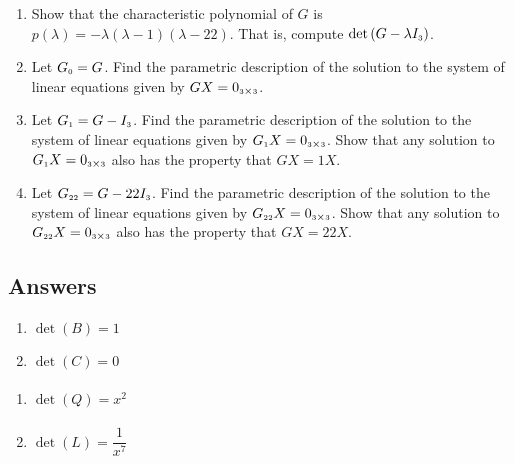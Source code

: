 \documentclass{ximera}
\begin{document}
\begin{enumerate}
\setcounter{enumi}{\value{HW}}

\item Show that the characteristic polynomial of $G$ is $p(\lambda) = -\lambda(\lambda - 1)(\lambda - 22)$.  That is, compute $\text{det}\left(G - \lambda I_{\mbox{\tiny$3$}}\right)$. \label{eigenfirst} 

\item Let $G_{\mbox{\tiny$0$}} = G$.  Find the parametric description of the solution to the system of linear equations given by $GX = 0_{\mbox{\tiny$3$} \times \mbox{\tiny$3$}}$.

\item Let $G_{\mbox{\tiny$1$}} = G - I_{\mbox{\tiny$3$}}$.  Find the parametric description of the solution to the system of linear equations given by $G_{\mbox{\tiny$1$}}X = 0_{\mbox{\tiny$3$} \times \mbox{\tiny$3$}}$.  Show that any solution to $G_{\mbox{\tiny$1$}}X = 0_{\mbox{\tiny$3$} \times \mbox{\tiny$3$}}$ also has the property that $GX = 1X$.

\item Let $G_{\mbox{\tiny$22$}} = G - 22 I_{\mbox{\tiny$3$}}$.  Find the parametric description of the solution to the system of linear equations given by $G_{\mbox{\tiny$22$}}X = 0_{\mbox{\tiny$3$} \times \mbox{\tiny$3$}}$.  Show that any solution to $G_{\mbox{\tiny$22$}}X = 0_{\mbox{\tiny$3$} \times \mbox{\tiny$3$}}$ also has the property that $GX = 22X$. \label{eigenlast}

\end{enumerate}

\newpage

\subsection{Answers}

\begin{multicols}{2}
\begin{enumerate}

\item $\det(B) = 1$
\item $\det(C) = 0$

\setcounter{HW}{\value{enumi}}
\end{enumerate}
\end{multicols}

\begin{multicols}{2}
\begin{enumerate}
\setcounter{enumi}{\value{HW}}

\item $\det(Q) = x^{2} \phantom{\dfrac{1}{x^{7}}}$
\item $\det(L) = \dfrac{1}{x^{7}}$

\setcounter{HW}{\value{enumi}}
\end{enumerate}
\end{multicols}
\end{document}
